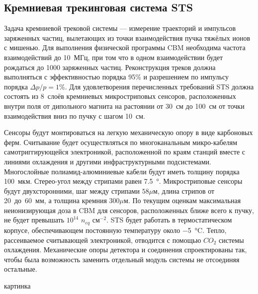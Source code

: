 
\subsection{Кремниевая трекинговая система STS}\label{sec:secSTS}

Задача кремниевой трековой системы --- измерение траекторий и импульсов заряженных частиц, вылетающих из точки взаимодействия пучка тяжёлых ионов с мишенью. Для выполнения физической программы CBM необходима частота взаимодействий до 10~МГц, при том что в одном взаимодействии будет рождаться до 1000 заряженных частиц. Реконструкция треков должна выполняться с эффективностью порядка 95\% и разрешением по импульсу порядка $\Delta p / p = 1\%$. Для удовлетворения перечисленных требований STS должна состоять из 8~слоёв кремниевых микростриповых сенсоров, расположенных внутри поля от дипольного магнита на растоянии от 30~см до 100~см от точки взаимодействия вниз по пучку с шагом 10~см.

Сенсоры будут монтироваться на легкую механическую опору в виде карбоновых ферм. Считывание будет осуществляться по многоканальным микро-кабелям самотриггирующейся электроникой, расположенной по краям станций вместе с линиями охлаждения и другими инфраструктурными подсистемами.
Многослойные полиамид-алюминиевые кабели будут иметь толщину порядка 100~мкм.
Стерео-угол между стрипами равен \SI{7.5}{\degree}.
Микростриповые сенсоры будут двухсторонними, шаг между стрипами $58 \mu$м, длина стрипов от 20~до~60~мм, а толщина кремния $300 \mu$м. По текущим оценкам максимальная неионизирующая доза в CBM для сенсоров, расположенных ближе всего к пучку, не будет превышать $10^{14}$ $n_{eq}$ см$^{-2}$. STS будет работать в термостатическом корпусе, обеспечивающем постоянную температуру около \SI{-5}{\degreeCelsius}. Тепло, рассеиваемое считывающей электроникой, отводится с помощью $CO_{2}$ системы охлаждения. Механические опоры детектора и соединения спроектированы так, чтобы была возможность заменить отдельный модуль системы не отсоединяя остальные.

\todo картинка



